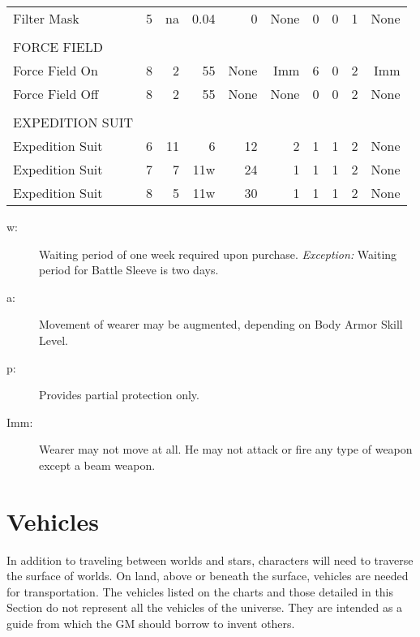 \begin{table}[htbp]
{\begin{minipage}{5.25in}
\begin{tabular}{lcrrrrrrrr}
        Filter Mask & 5 & na & 0.04 & 0 & None & 0 & 0 & 1 & None\\
        \\
        FORCE FIELD\\
        \rowcolor{grey}
        Force Field On & 8 & 2 & 55 & None & Imm & 6 & 0 & 2 & Imm\\
        Force Field Off & 8 & 2 & 55 & None & None & 0 & 0 & 2 & None\\
        \\
        EXPEDITION SUIT\\
        \rowcolor{grey}
        Expedition Suit & 6 & 11 & 6 & 12 & 2 & 1 & 1 & 2 & None\\
        Expedition Suit & 7 & 7 & 11w & 24 & 1 & 1 & 1 & 2 & None\\
        \rowcolor{grey}
        Expedition Suit & 8 & 5 & 11w & 30 & 1 & 1 & 1 & 2 & None\\
      \end{tabular}
     
      \medskip

      \parbox{\textwidth}{\begin{description}
        \item[w:] Waiting period of one week required upon purchase.
          \emph{Exception:} Waiting period for Battle Sleeve is two days.
        \item[a:] Movement of wearer may be augmented, depending on Body
          Armor Skill Level.
        \item[p:] Provides partial protection only.
        \item[Imm:] Wearer may not move at all. He may not attack or fire
          any type of weapon except a beam weapon.
        \end{description}}
    \end{minipage}}
\end{table}

\section{Vehicles}\label{sec:vehicles}

In addition to traveling between worlds and stars, characters will
need to traverse the surface of worlds. On land, above or beneath the
surface, vehicles are needed for transportation. The vehicles listed
on the charts and those detailed in this Section do not represent all
the vehicles of the universe. They are intended as a guide from which
the GM should borrow to invent others.

